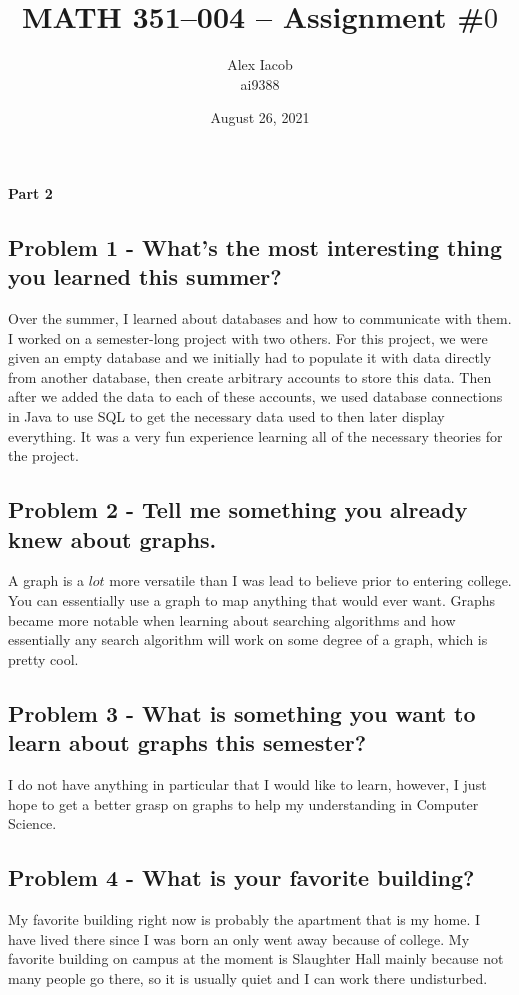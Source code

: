 \documentclass[10pt,a4paper]{article}
\title{MATH 351--004 -- Assignment \#$0$\\
}
\author{Alex Iacob\\
ai9388}
\date{August 26, 2021}
\begin{document}
\maketitle

\begin{center}
{\bf \large Part 2}
\end{center}

\subsection*{Problem 1 - What’s the most interesting thing you learned this summer?}

Over the summer, I learned about databases and how to communicate with them. I worked on a 
semester-long project with two others. For this project, we were given an empty database and
we initially had to populate it with data directly from another database, then create arbitrary
accounts to store this data. Then after we added the data to each of these accounts, we used
database connections in Java to use SQL to get the necessary data used to then later display 
everything. It was a very fun experience learning all of the necessary theories for the project.

\subsection*{Problem 2 - Tell me something you already knew about graphs.}

A graph is a $lot$ more versatile than I was lead to believe prior to entering college. You can
essentially use a graph to map anything that would ever want. Graphs became more notable when learning 
about searching algorithms and how essentially any search algorithm will work on some degree of a graph, 
which is pretty cool.

\subsection*{Problem 3 - What is something you want to learn about graphs this semester?}

I do not have anything in particular that I would like to learn, however, I just hope to get a better
grasp on graphs to help my understanding in Computer Science.

\subsection*{Problem 4 - What is your favorite building?}

My favorite building right now is probably the apartment that is my home. I have lived there
since I was born an only went away because of college. My favorite building on campus at the moment is 
Slaughter Hall mainly because not many people go there, so it is usually quiet and I can work there
undisturbed.
\end{document}
